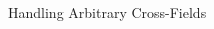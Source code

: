 \documentclass[compress,10pt,aspectratio=169]{beamer}
\begin{document}
\begin{frame}{Handling Arbitrary Cross-Fields}
\begin{columns}
\begin{column}{0.33\textwidth}
{        %
        }
        \end{column}
    \end{columns}

\end{frame}




\end{document}
